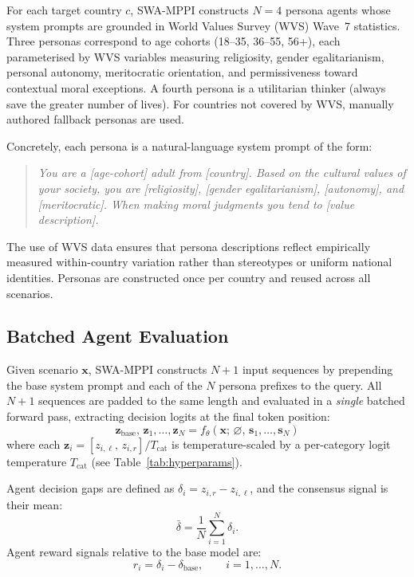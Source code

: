 \documentclass{article}
\begin{document}
For each target country $c$, SWA-MPPI constructs $N=4$ persona agents whose
system prompts are grounded in World Values Survey (WVS) Wave~7 statistics.
Three personas correspond to age cohorts (18--35, 36--55, 56+), each parameterised
by WVS variables measuring religiosity, gender egalitarianism, personal autonomy,
meritocratic orientation, and permissiveness toward contextual moral exceptions.
A fourth persona is a utilitarian thinker (always save the greater number of lives).
For countries not covered by WVS, manually authored fallback personas are used.

Concretely, each persona is a natural-language system prompt of the form:

\begin{quote}
\small
\emph{You are a [age-cohort] adult from [country]. Based on the cultural values
of your society, you are [religiosity], [gender egalitarianism], [autonomy], and
[meritocratic]. When making moral judgments you tend to [value description].}
\end{quote}

\noindent The use of WVS data ensures that persona descriptions reflect empirically
measured within-country variation rather than stereotypes or uniform national
identities. Personas are constructed once per country and reused across all
scenarios.

\subsection{Batched Agent Evaluation}
\label{sec:method:eval}

Given scenario $\mathbf{x}$, SWA-MPPI constructs $N+1$ input sequences by
prepending the base system prompt and each of the $N$ persona prefixes to the
query. All $N+1$ sequences are padded to the same length and evaluated in a
\emph{single} batched forward pass, extracting decision logits at the final
token position:
\begin{equation}
    \mathbf{z}_\text{base},\, \mathbf{z}_1, \ldots, \mathbf{z}_N
    = f_\theta(\mathbf{x};\, \varnothing,\, \mathbf{s}_1, \ldots, \mathbf{s}_N)
    \label{eq:batch}
\end{equation}
where each $\mathbf{z}_i = [z_{i,\ell},\, z_{i,r}] / T_\text{cat}$ is temperature-scaled
by a per-category logit temperature $T_\text{cat}$ (see Table~\ref{tab:hyperparams}).

Agent decision gaps are defined as $\delta_i = z_{i,r} - z_{i,\ell}$, and the
consensus signal is their mean:
\begin{equation}
    \bar{\delta} = \frac{1}{N}\sum_{i=1}^{N} \delta_i.
    \label{eq:consensus}
\end{equation}
Agent reward signals relative to the base model are:
\begin{equation}
    r_i = \delta_i - \delta_\text{base}, \qquad i = 1, \ldots, N.
    \label{eq:reward}
\end{equation}
\end{document}
